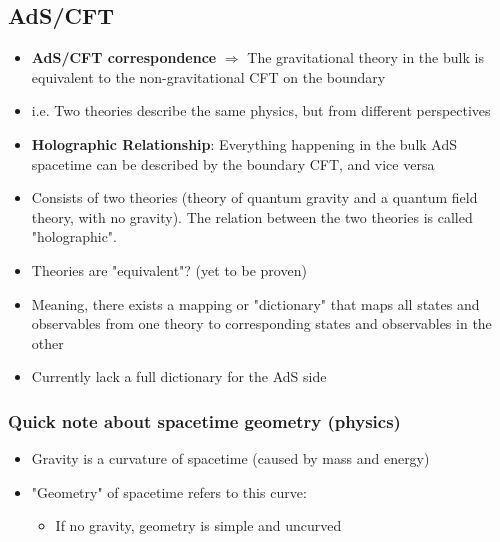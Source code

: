 \documentclass[12pt]{article}
\begin{document}
    \subsection*{AdS/CFT}
    \begin{itemize}
        \item \textbf{AdS/CFT correspondence} $\Rightarrow$ The gravitational theory in the bulk is equivalent to the non-gravitational CFT on the boundary
        \item i.e. Two theories describe the same physics, but from different perspectives
        \item \textbf{Holographic Relationship}: Everything happening in the bulk AdS spacetime can be described by the boundary CFT, and vice versa
        \item Consists of two theories (theory of quantum gravity and a quantum field theory, with no gravity). The relation between the two theories is called "holographic".
        \item Theories are "equivalent"? (yet to be proven)
        \item Meaning, there exists a mapping or "dictionary" that maps all states and observables from one theory to corresponding states and observables in the other
        \item Currently lack a full dictionary for the AdS side
    \end{itemize}

    \subsubsection*{Quick note about spacetime geometry (physics)}
    \begin{itemize}
        \item Gravity is a curvature of spacetime (caused by mass and energy)
        \item "Geometry" of spacetime refers to this curve:
        \begin{itemize}
            \item If no gravity, geometry is simple and uncurved
        \end{itemize}
    \end{itemize}
\end{document}
